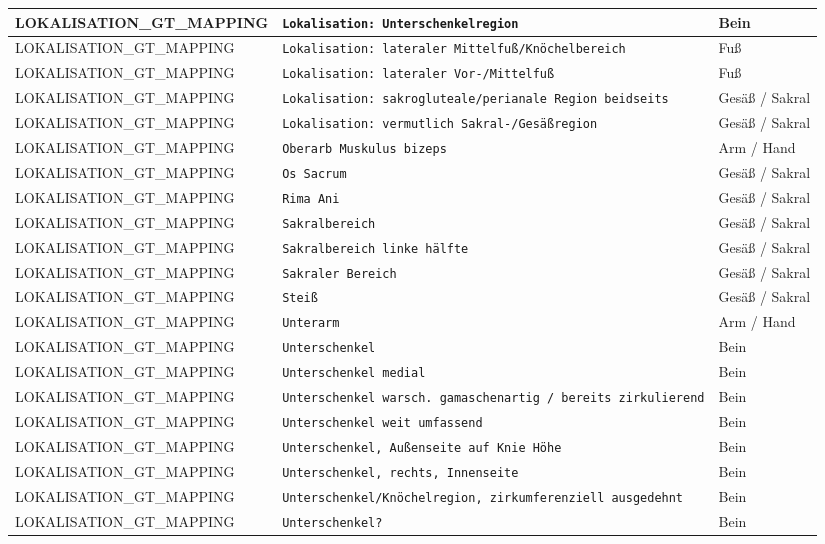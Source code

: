 \begin{longtable}{|p{3.5cm}|p{5cm}|p{6.5cm}|}
LOKALISATION\_GT\_MAPPING & \texttt{Lokalisation: Unterschenkelregion} & Bein \\ \hline
LOKALISATION\_GT\_MAPPING & \texttt{Lokalisation: lateraler Mittelfuß/Knöchelbereich} & Fuß \\ \hline
LOKALISATION\_GT\_MAPPING & \texttt{Lokalisation: lateraler Vor-/Mittelfuß} & Fuß \\ \hline
LOKALISATION\_GT\_MAPPING & \texttt{Lokalisation: sakrogluteale/perianale Region beidseits} & Gesäß / Sakral \\ \hline
LOKALISATION\_GT\_MAPPING & \texttt{Lokalisation: vermutlich Sakral-/Gesäßregion} & Gesäß / Sakral \\ \hline
LOKALISATION\_GT\_MAPPING & \texttt{Oberarb Muskulus bizeps} & Arm / Hand \\ \hline
LOKALISATION\_GT\_MAPPING & \texttt{Os Sacrum} & Gesäß / Sakral \\ \hline
LOKALISATION\_GT\_MAPPING & \texttt{Rima Ani} & Gesäß / Sakral \\ \hline
LOKALISATION\_GT\_MAPPING & \texttt{Sakralbereich} & Gesäß / Sakral \\ \hline
LOKALISATION\_GT\_MAPPING & \texttt{Sakralbereich linke hälfte} & Gesäß / Sakral \\ \hline
LOKALISATION\_GT\_MAPPING & \texttt{Sakraler Bereich} & Gesäß / Sakral \\ \hline
LOKALISATION\_GT\_MAPPING & \texttt{Steiß} & Gesäß / Sakral \\ \hline
LOKALISATION\_GT\_MAPPING & \texttt{Unterarm} & Arm / Hand \\ \hline
LOKALISATION\_GT\_MAPPING & \texttt{Unterschenkel} & Bein \\ \hline
LOKALISATION\_GT\_MAPPING & \texttt{Unterschenkel  medial} & Bein \\ \hline
LOKALISATION\_GT\_MAPPING & \texttt{Unterschenkel warsch. gamaschenartig / bereits zirkulierend} & Bein \\ \hline
LOKALISATION\_GT\_MAPPING & \texttt{Unterschenkel weit umfassend} & Bein \\ \hline
LOKALISATION\_GT\_MAPPING & \texttt{Unterschenkel, Außenseite auf Knie Höhe} & Bein \\ \hline
LOKALISATION\_GT\_MAPPING & \texttt{Unterschenkel, rechts, Innenseite} & Bein \\ \hline
LOKALISATION\_GT\_MAPPING & \texttt{Unterschenkel/Knöchelregion, zirkumferenziell ausgedehnt} & Bein \\ \hline
LOKALISATION\_GT\_MAPPING & \texttt{Unterschenkel?} & Bein \\ \hline

\end{longtable}
